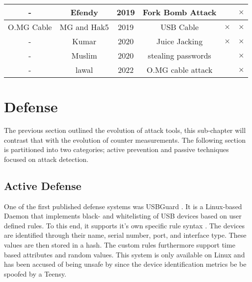 {\begin{tabular}{|c c c c c c|}
 \hline
  - & Efendy\cite{efendyExploringPossibilityUSB2019} & 2019 & Fork Bomb Attack & & $\times$ \\
 \hline
 O.MG Cable & MG and Hak5  \cite{hak5MGCable} \cite{MGCable2019a} & 2019 & USB Cable & $\times$ & $\times$ \\
 \hline
- & Kumar \cite{kumarJuiceJackingUSB2020} & 2020 & Juice Jacking & $\times$ & $\times$ \\
\hline
- & Muslim \cite{muslimImplementationAnalysisUSB2020} & 2020 & stealing passwords & & $\times$ \\
\hline
-  & lawal \cite{lawalFacilitatingCyberenabledFraud2022} & 2022 & O.MG cable attack & & $\times$ \\
 \hline 
\end{tabular}
}%

\section{Defense} \label{HistoryOfDefense}

The previous section outlined the evolution of attack tools, this sub-chapter will contrast that with the evolution of counter measurements. 
The following section is partitioned into two categories; active prevention and passive techniques focused on attack detection.

\subsection{Active Defense}

One of the first published defense systems was USBGuard \cite{HomeUSBGuard}. It is a Linux-based Daemon that implements black- and whitelisting of USB devices based on user defined rules. To this end, it supports it's own specific rule syntax \cite{RuleLanguageUSBGuard}. The devices are identified through their name, serial number, port, and interface type. These values are then stored in a hash. The custom rules furthermore support time based attributes and random values. This system is only available on Linux and has been accused of being unsafe by \cite{farhiMalboardNovelUser2019} since the device identification metrics be be spoofed by a Teensy. 

